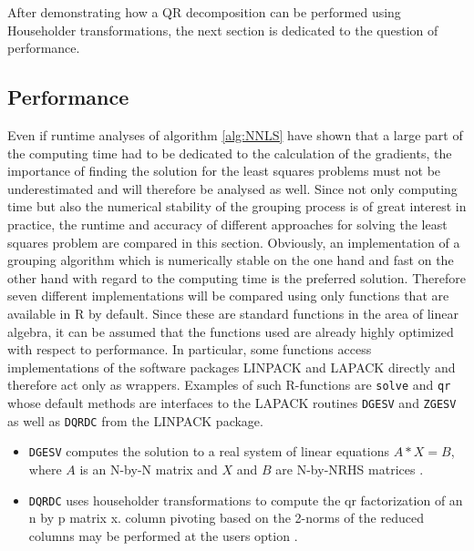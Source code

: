 After demonstrating how a QR decomposition can be performed using Householder transformations, the next section is dedicated to the question of performance. 

\subsection{Performance}

Even if runtime analyses of algorithm \ref{alg:NNLS} have shown that a large part of the computing time had to be dedicated to the calculation of the gradients, the importance of finding the solution for the least squares problems must not be underestimated and will therefore be analysed as well. Since not only computing time but also the numerical stability of the grouping process is of great interest in practice, the runtime and accuracy of different approaches for solving the least squares problem are compared in this section.  Obviously, an implementation of a grouping algorithm which is numerically stable on the one hand and fast on the other hand with regard to the computing time is the preferred solution. Therefore seven different implementations will be compared using only functions that are available in \textsf{R} by default. Since these are standard functions in the area of linear algebra, it can be assumed that the functions used are already highly optimized with respect to performance. In particular, some functions access implementations of the software packages LINPACK and LAPACK directly and therefore act only as wrappers. Examples of such \textsf{R}-functions are \texttt{solve} and \texttt{qr} whose default methods are interfaces to the LAPACK routines \texttt{DGESV} and \texttt{ZGESV} as well as \texttt{DQRDC} from the LINPACK package. 

\begin{itemize}
	\item \texttt{DGESV} computes the solution to a real system of linear equations $A * X = B$, where $A$ is an N-by-N matrix and $X$ and $B$ are N-by-NRHS matrices \cite{lapack}.
	\item \texttt{DQRDC} uses householder transformations to compute the qr factorization of an n by p matrix x.  column pivoting based on the 2-norms of the reduced columns may be performed at the users option \cite{linpack}.
\end{itemize}


